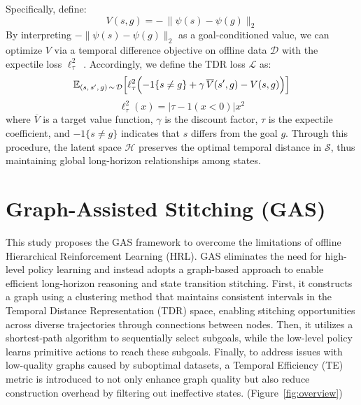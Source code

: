 \documentclass{article}
\begin{document}
Specifically, define:
\begin{equation}
V(s, g) =
-\,\bigl\|\psi(s) - \psi(g)\bigr\|_2
\end{equation}
By interpreting \(-\|\psi(s) - \psi(g)\|_2\) as a goal-conditioned value, we can optimize \(V\) via a temporal difference objective on offline data \(\mathcal{D}\) with the expectile loss \(\ell_\tau^2\)~\cite{newey1987asymmetric}. 
Accordingly, we define the TDR loss \(\mathcal{L}\) as:
\begin{equation}
\mathbb{E}_{(s,\,s',\,g)\,\sim\,\mathcal{D}}
\Bigl[\ell_{\tau}^2\Bigl(-{1}\{s \neq g\} + \gamma\,\overline{V}(s', g)  - V(s, g)\Bigr)\Bigr]
\end{equation}
\normalsize
\begin{equation}
\label{eq:expectile}
\ell_\tau^2 (x) = 
|\tau - 1(x < 0)| x^2
\end{equation}
where \(\overline{V}\) is a target value function, \(\gamma\) is the discount factor,  $\tau$ is the expectile coefficient, and \(-{1}\{s \neq g\}\) indicates that \(s\) differs from the goal \(g\). Through this procedure, the latent space \(\mathcal{H}\) preserves the optimal temporal distance in \(\mathcal{S}\), thus maintaining global long-horizon relationships among states. 


\section{Graph-Assisted Stitching (GAS)}
This study proposes the GAS framework to overcome the limitations of offline Hierarchical Reinforcement Learning (HRL). GAS eliminates the need for high-level policy learning and instead adopts a graph-based approach to enable efficient long-horizon reasoning and state transition stitching. First, it constructs a graph using a clustering method that maintains consistent intervals in the Temporal Distance Representation (TDR) space, enabling stitching opportunities across diverse trajectories through connections between nodes. Then, it utilizes a shortest-path algorithm to sequentially select subgoals, while the low-level policy learns primitive actions to reach these subgoals. Finally, to address issues with low-quality graphs caused by suboptimal datasets, a Temporal Efficiency (TE) metric is introduced to not only enhance graph quality but also reduce construction overhead by filtering out ineffective states. (Figure~\ref{fig:overview})
\end{document}
